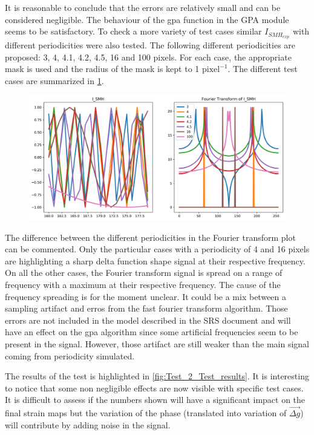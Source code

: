 \documentclass[12pt, titlepage]{article}
\begin{document}
It is reasonable to conclude that the errors are relatively small and can be considered negligible. The behaviour of the gpa function in the GPA module seems to be satisfactory. To check a more variety of test cases similar $I_{SMH_{exp}}$ with different periodicities were also tested. The following different periodicities are proposed: 3, 4, 4.1, 4.2, 4.5, 16 and 100 pixels. For each case, the appropriate mask is used and the radius of the mask is kept to 1 $\text{pixel}^{-1}$. The different test cases are summarized in \cref{fig:Test_2_Test_cases}. 

\begin{figure}[H]
\begin{center}
\includegraphics[scale=0.5]{Figures/Test_2_test_cases.png}
\caption{}
\label{fig:Test_2_Test_cases}
\end{center}
\end{figure}

The difference between the different periodicities in the Fourier transform plot can be commented. Only the particular cases with a periodicity of 4 and 16 pixels are highlighting a sharp delta function shape signal at their respective frequency. On all the other cases, the Fourier transform signal is spread on a range of frequency with a maximum at their respective frequency. The cause of the frequency spreading is for the moment unclear. It could be a mix between a sampling artifact and erros from the fast fourier transform algorithm. Those errors are not included in the model described in the SRS document and will have an effect on the gpa algorithm since some artificial frequencies seem to be present in the signal. However, those artifact are still weaker than the main signal coming from periodicity simulated.\medskip

The results of the test is highlighted in \cref{fig:Test_2_Test_results}. It is interesting to notice that some non negligible effects are now visible with specific test cases. It is difficult to assess if the numbers shown will have a significant impact on the final strain maps but the variation of the phase (translated into variation of $\overrightarrow{\Delta g}$) will contribute by adding noise in the signal.
\end{document}
